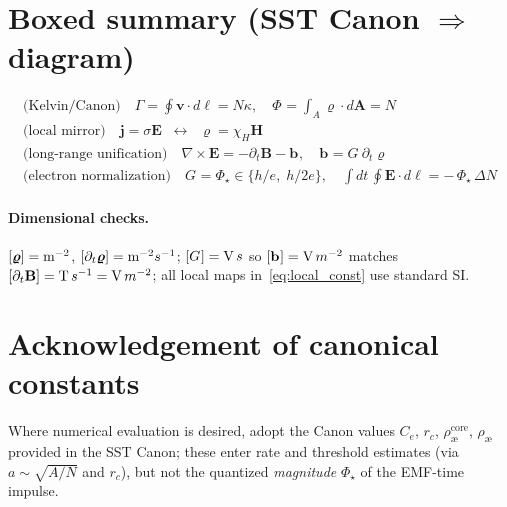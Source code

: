 \documentclass[10pt,reprint,aps,onecolumn,nofootinbib]{revtex4-2}
\def\boldsymbol#1{#1}%
\def\mathcal#1{#1}%
\def\!{}%
\def\swirlarrow{}%
\DeclareRobustCommand{\swirlarrow}{%
    \mathchoice{\mkern-2mu\scriptstyle\boldsymbol{\circlearrowleft}}%
    {\mkern-2mu\scriptstyle\boldsymbol{\circlearrowleft}}%
    {\mkern-2mu\scriptscriptstyle\boldsymbol{\circlearrowleft}}%
    {\mkern-2mu\scriptscriptstyle\boldsymbol{\circlearrowleft}}%
}
\begin{document}
\section{Boxed summary (SST Canon \texorpdfstring{$\Rightarrow$}{ -> } diagram)}
\[
    \boxed{
        \begin{gathered}
        \text{(Kelvin/Canon)}\quad \Gamma=\oint \mathbf v\!\cdot d\boldsymbol\ell = N\kappa, \quad
        \Phi_{\swirlarrow}=\int_A \bm{\varrho}\!\cdot d\mathbf A=N \\
        \text{(local mirror)}\quad \mathbf j=\sigma\mathbf E \;\;\leftrightarrow\;\; \bm{\varrho}=\chi_H\mathbf H \\
        \text{(long-range unification)}\quad \nabla\times\mathbf E = -\partial_t\mathbf B - \mathbf b_{\swirlarrow},\quad
        \mathbf b_{\swirlarrow}=\mathcal G_{\swirlarrow}\,\partial_t\bm{\varrho} \\
        \text{(electron normalization)}\quad \mathcal G_{\swirlarrow}=\Phi_\star \in\{h/e,\;h/2e\},\quad
        \int dt\,\oint \mathbf E\!\cdot d\boldsymbol\ell = -\,\Phi_\star\,\Delta N
        \end{gathered}}
\]

\paragraph{Dimensional checks.}
    $[\bm{\varrho}]={\textrm m^{-2}}$, $[\partial_t\bm{\varrho}]={\textrm m^{-2}s^{-1}}$; $[\mathcal G_{\swirlarrow}]={\textrm V\,s}$ so $[\mathbf b_{\swirlarrow}]={\textrm V\,m^{-2}}$ matches $[\partial_t\mathbf B]={\textrm T\,s^{-1}}={\textrm V\,m^{-2}}$; all local maps in~\ref{eq:local_const} use standard SI.

\section*{Acknowledgement of canonical constants}
Where numerical evaluation is desired, adopt the Canon values $C_e$, $r_c$, $\rho_{\text{\ae}}^{\text{core}}$, $\rho_{\text{\ae}}$ provided in the SST Canon; these enter rate and threshold estimates (via $a\sim \sqrt{A/N}$ and $r_c$), but not the quantized \emph{magnitude} $\Phi_\star$ of the EMF-time impulse.


\end{document}
